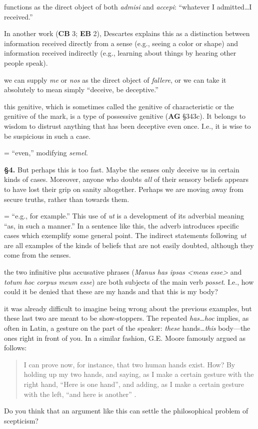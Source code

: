  functions as the direct object of both \textit{admisi} and \textit{accepi}: ``whatever I admitted\dots I received.''

 In another work (\textbf{CB} 3; \textbf{EB} 2), Descartes explains this as a distinction between information received directly from a sense (e.g., seeing a color or shape) and information received indirectly (e.g., learning about things by hearing other people speak).

 we can supply \textit{me} or \textit{nos} as the direct object of \textit{fallere}, or we can take it absolutely to mean simply ``deceive, be deceptive.''

 this genitive, which is sometimes called the genitive of characteristic or the genitive of the mark, is a type of possessive genitive (\textbf{AG} §343c). It belongs to wisdom to distrust anything that has been deceptive even once. I.e., it is wise to be suspicious in such a case.

 = ``even,'' modifying \textit{semel}.

\textbf{§4.} But perhaps this is too fast. Maybe the senses only deceive us in certain kinds of cases. Moreover, anyone who doubts \textit{all} of their sensory beliefs appears to have lost their grip on sanity altogether. Perhaps we are moving away from secure truths, rather than towards them. 

 = ``e.g., for example.'' This use of \textit{ut} is a development of its adverbial meaning ``as, in such a manner.'' In a sentence like this, the adverb introduces specific cases which exemplify some general point. The indirect statements following \textit{ut} are all examples of the kinds of beliefs that are not easily doubted, although they come from the senses.

 the two infinitive plus accusative phrases (\textit{Manus has ipsas <meas esse>} and \textit{totum hoc corpus meum esse}) are both subjects of the main verb \textit{posset}. I.e., how could it be denied that these are my hands and that this is my body?

 it was already difficult to imagine being wrong about the previous examples, but these last two are meant to be show-stoppers. The repeated \textit{has\dots hoc} implies, as often in Latin, a gesture on the part of the speaker: \textit{these} hands\dots \textit{this} body---the ones right in front of you. In a similar fashion, G.E. Moore famously argued as follows:
\begin{quote}
    I can prove now, for instance, that two human hands exist. How? By holding up my two hands, and saying, as I make a certain gesture with the right hand, ``Here is one hand'', and adding, as I make a certain gesture with the left, ``and here is another'' \parencite[165--166]{baldwin1993}.
\end{quote}
Do you think that an argument like this can settle the philosophical problem of scepticism?

